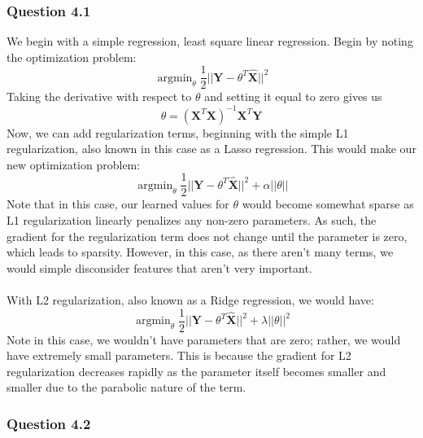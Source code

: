 \documentclass[11pt,letterpaper]{article}
\DeclareMathOperator*{\argmin}{argmin}
\begin{document}
\subsubsection*{Question 4.1}
We begin with a simple regression, least square linear regression. Begin by 
noting the optimization problem:
\begin{equation}
    \argmin_{\theta} \dfrac{1}{2}||\textbf{Y}-\theta^T\hat{\textbf{X}}||^2
\end{equation}
Taking the derivative with respect to $\theta$ and setting it equal to zero 
gives us 
\begin{equation}
\theta = \left(\textbf{X}^T\textbf{X}\right)^{-1}\textbf{X}^T\textbf{Y}
\end{equation}
Now, we can add regularization terms, beginning with the simple L1 
regularization, also known in this case as a Lasso regression. This would make 
our new optimization problem:
\begin{equation}
    \argmin_{\theta} \dfrac{1}{2}||\textbf{Y}-\theta^T\hat{\textbf{X}}||^2 + 
    \alpha ||\theta||
\end{equation}
Note that in this case, our learned values for $\theta$ would become somewhat 
sparse as L1 regularization linearly penalizes any non-zero parameters.
As such, the gradient for the regularization term does not change until the 
parameter is zero, which leads to sparsity. However, in this case, as there 
aren't many terms, we would simple disconsider features that aren't very 
important. \\ \\
With L2 regularization, also known as a Ridge regression, we would have:
\begin{equation}
    \argmin_{\theta} \dfrac{1}{2}||\textbf{Y}-\theta^T\hat{\textbf{X}}||^2 + 
    \lambda ||\theta||^2
\end{equation}
Note in this case, we wouldn't have parameters that are zero; rather, we would 
have extremely small parameters. This is because the gradient for L2 
regularization decreases rapidly as the parameter itself becomes smaller and 
smaller due to the parabolic nature of the term. 

\subsubsection*{Question 4.2}
\end{document}
